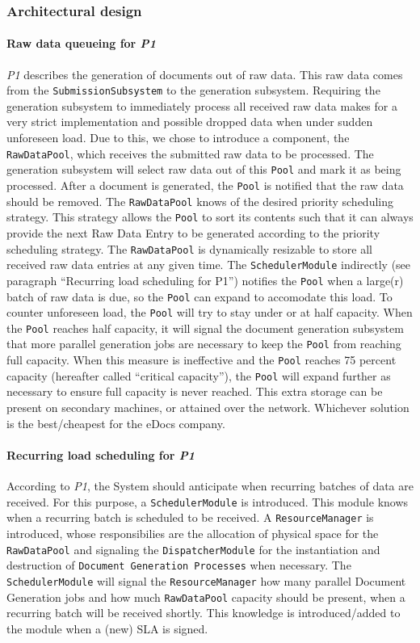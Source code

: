 \documentclass[a4paper,10pt]{article}
\begin{document}
\subsubsection{Architectural design}
\paragraph{Raw data queueing for \emph{P1}}
\emph{P1} describes the generation of documents out of raw data. This raw data comes from the  \texttt{SubmissionSubsystem} to the generation subsystem. Requiring the generation subsystem to immediately process all received raw data makes for a very strict implementation and possible dropped data when under sudden unforeseen load. Due to this, we chose to introduce a component, the \texttt{RawDataPool}, which receives the submitted raw data to be processed. The generation subsystem will select raw data out of this \texttt{Pool} and mark it as being processed. After a document is generated, the \texttt{Pool} is notified that the raw data should be removed. The \texttt{RawDataPool} knows of the desired priority scheduling strategy. This strategy allows the \texttt{Pool} to sort its contents such that it can always provide the next Raw Data Entry to be generated according to the priority scheduling strategy. The \texttt{RawDataPool} is dynamically resizable to store all received raw data entries at any given time. The \texttt{SchedulerModule} indirectly (see paragraph ``Recurring load scheduling for P1'') notifies the \texttt{Pool} when a large(r) batch of raw data is due, so the \texttt{Pool} can expand to accomodate this load. To counter unforeseen load, the \texttt{Pool} will try to stay under or at half capacity. When the \texttt{Pool} reaches half capacity, it will signal the document generation subsystem that more parallel generation jobs are necessary to keep the \texttt{Pool} from reaching full capacity. When this measure is ineffective and the \texttt{Pool} reaches 75 percent capacity (hereafter called ``critical capacity''), the \texttt{Pool} will expand further as necessary to ensure full capacity is never reached. This extra storage can be present on secondary machines, or attained over the network. Whichever solution is the best/cheapest for the eDocs company.

\paragraph{Recurring load scheduling for \emph{P1}}
According to \emph{P1}, the System should anticipate when recurring batches of data are received. For this purpose, a \texttt{SchedulerModule} is introduced. This module knows when a recurring batch is scheduled to be received. A \texttt{ResourceManager} is introduced, whose responsibilies are the allocation of physical space for the \texttt{RawDataPool} and signaling the \texttt{DispatcherModule} for the instantiation and destruction of \texttt{Document Generation Processes} when necessary. The \texttt{SchedulerModule} will signal the \texttt{ResourceManager} how many parallel Document Generation jobs and how much \texttt{RawDataPool} capacity should be present, when a recurring batch will be received shortly. This knowledge is introduced/added to the module when a (new) SLA is signed.
\end{document}
